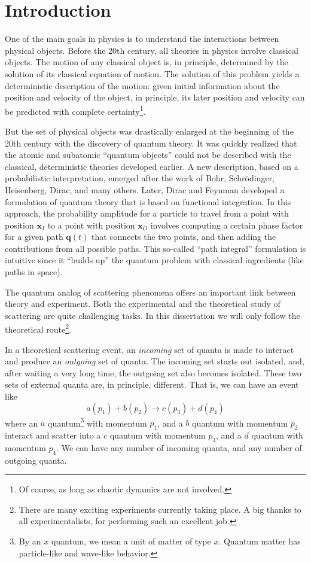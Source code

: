 \chapter{Introduction}
One of the main goals in physics is to understand the interactions between physical objects. Before the 20th century, all theories in physics involve classical objects. The motion of any classical object is, in principle, determined by the solution of its classical equation of motion. The solution of this problem yields a deterministic description of the motion: given initial information about the position and velocity of the object, in principle, its later position and velocity can be predicted with complete certainty\footnote{Of course, as long as chaotic dynamics are not involved.}.

But the set of physical objects was drastically enlarged at the beginning of the 20th century with the discovery of quantum theory. It was quickly realized that the atomic and subatomic ``quantum objects'' could not be described with the classical, deterministic theories developed earlier. A new description, based on a probabilistic interpretation, emerged after the work of Bohr, Schr\"{o}dinger, Heisenberg, Dirac, and many others. Later, Dirac and Feynman developed a formulation of quantum theory that is based on functional integration. In this approach, the probability amplitude for a particle to travel from a point with position $\mathbf{x}_{I}$ to a point with position $\mathbf{x}_{O}$ involves computing a certain phase factor for a given path $\mathbf{q}(t)$ that connects the two points, and then adding the contributions from all possible paths. This so-called ``path integral'' formulation is intuitive since it ``builds up'' the quantum problem with classical ingredients (like paths in space).

The quantum analog of scattering phenomena offers an important link between theory and experiment. Both the experimental and the theoretical study of scattering are quite challenging tasks. In this dissertation we will only follow the theoretical route\footnote{There are many exciting experiments currently taking place. A big thanks to all experimentalists, for performing such an excellent job.}.

In a theoretical scattering event, an \textit{incoming} set of quanta is made to interact and produce an \textit{outgoing} set of quanta. The incoming set starts out isolated, and, after waiting a very long time, the outgoing set also becomes isolated. These two sets of external quanta are, in principle, different. That is, we can have an event like
\begin{equation}
	a(p_{1}) + b(p_{2}) \longrightarrow c(p_{3}) + d(p_{4})
\end{equation}
where an $a$ quantum\footnote{By an $x$ quantum, we mean a unit of matter of type $x$. Quantum matter has particle-like and wave-like behavior.} with momentum $p_{1}$, and a $b$ quantum with momentum $p_{2}$ interact and scatter into a $c$ quantum with momentum $p_{3}$, and a $d$ quantum with momentum $p_{4}$. We can have any number of incoming quanta, and any number of outgoing quanta.

